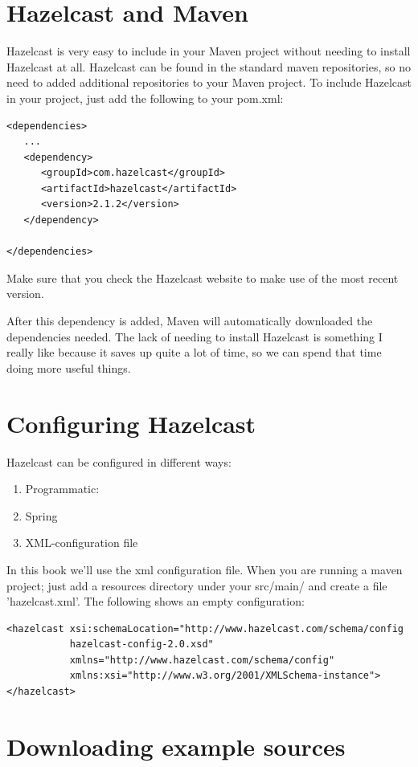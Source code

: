 \section{Hazelcast and Maven}
Hazelcast is very easy to include in your Maven project without needing to install Hazelcast at all. Hazelcast can be found in the standard maven repositories, so no need to added additional repositories to your Maven project. To include Hazelcast in your project, just add the following to your pom.xml:

\begin{verbatim}
<dependencies>	
   ...
   <dependency>
      <groupId>com.hazelcast</groupId>
      <artifactId>hazelcast</artifactId>
      <version>2.1.2</version>
   </dependency>

</dependencies>
\end{verbatim}	

Make sure that you check the Hazelcast website to make use of the most recent version. 

After this dependency is added, Maven will automatically downloaded the dependencies needed.  The lack of needing to install Hazelcast is something I really like because it saves up quite a lot of time, so we can spend that time doing more useful things.

\section{Configuring Hazelcast}
Hazelcast can be configured in different ways:
\begin{enumerate}
\item Programmatic:
\item Spring
\item XML-configuration file
\end{enumerate}
In this book we'll use the xml configuration file. When you are running a maven project; just add a resources directory under your src/main/ and create a file 'hazelcast.xml'. The following shows an empty configuration:
\begin{verbatim}
<hazelcast xsi:schemaLocation="http://www.hazelcast.com/schema/config
           hazelcast-config-2.0.xsd"
           xmlns="http://www.hazelcast.com/schema/config"
           xmlns:xsi="http://www.w3.org/2001/XMLSchema-instance">
</hazelcast>
\end{verbatim}

\section{Downloading example sources}

